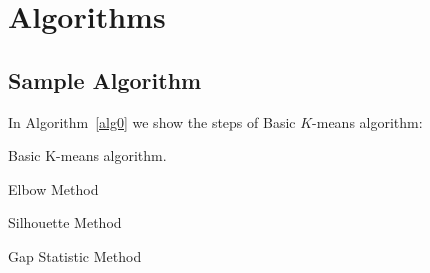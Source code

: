 \chapter{Algorithms}\label{ch:algorithms}

\section{Sample Algorithm}
In Algorithm~\ref{alg0} we show the steps of Basic $K$-means algorithm:

\begin{algorithm}
  \caption{Basic K-means algorithm.}
  \label{alg0}
  \begin{algorithmic}
    
  \end{algorithmic}
\end{algorithm}

\begin{algorithm}
  \caption{Elbow Method}
  \label{alg1}
  \begin{algorithmic}
    
  \end{algorithmic}
\end{algorithm}

\begin{algorithm}
  \caption{Silhouette Method}
  \label{alg2}
  \begin{algorithmic}
    
  \end{algorithmic}
\end{algorithm}

\begin{algorithm}
  \caption{Gap Statistic Method}
  \label{alg3}
  \begin{algorithmic}
    
  \end{algorithmic}
\end{algorithm}

\endinput
